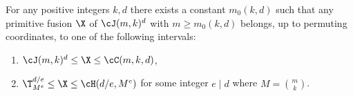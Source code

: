 \begin{theorem}
    \label{main-thm}
    {For any positive integers $k,d$ there exists a constant $m_0(k,d)$ such that
    any primitive fusion $\X$ of $\cJ(m, k)^d$ with $m \geq m_0(k, d)$ belongs, up to permuting coordinates, to one of the following intervals:
    \begin{enumerate}
        \item $\cJ(m, k)^d \leq \X \leq \cC(m, k, d)$,  
        \item $\T_{M^e}^{d/e} \leq \X \leq \cH(d/e, M^e)$ for some integer $e \mid d$ where $M=\binom{m}{k}$.
    \end{enumerate}
    }
\end{theorem}

